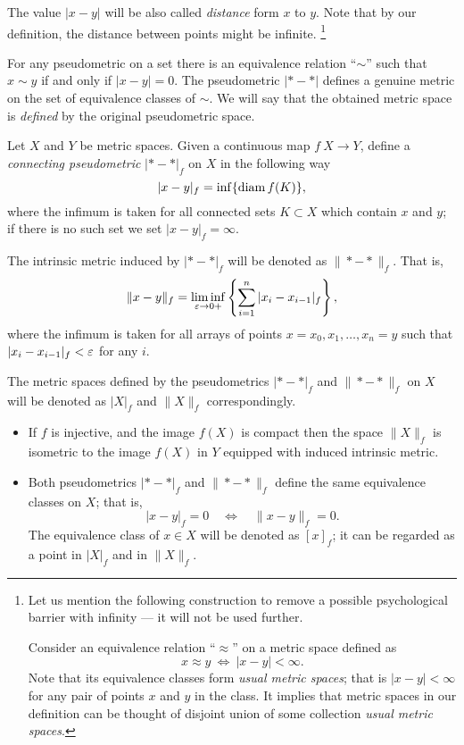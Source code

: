 \documentclass[a4paper,10pt]{amsart}
\begin{document}
The value $|x-y|$ will be also called \emph{distance} form $x$ to $y$.
Note that by our definition, the distance between points might be infinite.%
\footnote{Let us mention the following construction to remove a possible psychological barrier with infinity --- it will not be used further.

Consider an equivalence relation ``$\approx$'' on a metric space defined as \[x\approx y\  \iff\  |x-y|<\infty.\]
Note that its equivalence classes form \emph{usual metric spaces}; 
that is $|x-y|<\infty$ for any pair of points $x$ and $y$ in the class.
It implies that metric spaces in our definition 
can be thought of disjoint union of some collection \emph{usual metric spaces}.}

For any pseudometric on a set 
there is an equivalence relation ``$\sim$''
such that $x\sim y$ if and only if $|x-y|=0$.
The pseudometric $|{*}-{*}|$ defines a genuine metric on the set of equivalence classes of $\sim$.
We will say that the obtained metric space is \emph{defined} by the  original pseudometric space.%

Let $X$ and $Y$ be metric spaces.
Given a continuous map $f\:X\to Y$,
define a \emph{connecting pseudometric} $|{*}-{*}|_f$ on $X$ in
the following way
\[|x-y|_f=\inf\{\mathop{\rm diam}\nolimits f(K)\},\]
where the infimum is taken for all connected sets $K\subset X$ which contain $x$ and $y$;
if there is no such set we set $|x-y|_f=\infty$.

The intrinsic metric induced by $|{*}-{*}|_f$ will be denoted as 
$\|{*}-{*}\|_f$. 
That is, 
\[\|x-y\|_f=\liminf_{\varepsilon\to0+}\left\{\sum_{i=1}^n|x_i-x_{i-1}|_f\right\},\]
where the infimum is taken for all arrays of points 
$x=x_0,x_1,\dots,x_n=y$ such that 
$|x_i-x_{i-1}|_f<\varepsilon$ for any $i$.

The metric spaces defined by the pseudometrics $|{*}-{*}|_f$ 
and $\|{*}-{*}\|_f$ on $X$ will be denoted as $|X|_f$ and $\|X\|_f$ correspondingly.

\begin{itemize}
\item If $f$ is injective, and the image $f(X)$ is compact then 
the space $\|X\|_f$ is isometric to the image $f(X)$ in $Y$ equipped with induced intrinsic metric. 
\item Both pseudometrics $|{*}-{*}|_f$ and  $\|{*}-{*}\|_f$
define the same equivalence classes on $X$;
that is,
\[|x-y|_f=0\quad\iff\quad\|x-y\|_f=0.\]
The equivalence class of $x\in X$ will be denoted as $[x]_f$; 
it can be regarded as a point in  $|X|_f$ and in $\|X\|_f$.
\end{itemize}
\end{document}
